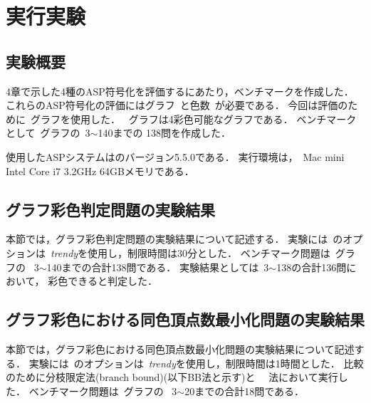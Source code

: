 \chapter{実行実験}

\section{実験概要}

4章で示した4種のASP符号化を評価するにあたり，ベンチマークを作成した．
これらのASP符号化の評価にはグラフ~と色数~が必要である．
今回は評価のために~グラフを使用した．
~グラフは4彩色可能なグラフである．
ベンチマークとして~グラフの~3$\sim$140までの
138問を作成した．

使用したASPシステムは{\clingo}のバージョン5.5.0である．
実行環境は，~Mac mini Intel Core i7 3.2GHz 64GBメモリである．

\section{グラフ彩色判定問題の実験結果}

本節では，グラフ彩色判定問題の実験結果について記述する．
実験には~{\clingo}のオプションは~\textit{trendy}を使用し，制限時間は30分とした．
ベンチマーク問題は~グラフの
~3$\sim$140までの合計138問である．
実験結果としては~3$\sim$138の合計136問において，
彩色できると判定した．

\section{グラフ彩色における同色頂点数最小化問題の実験結果}


本節では，グラフ彩色における同色頂点数最小化問題の実験結果について記述する．
実験には~{\clingo}のオプションは~\textit{trendy}を使用し，制限時間は1時間とした．
比較のために分枝限定法(branch bound)(以下BB法と示す)と
~~法において実行した．
ベンチマーク問題は~グラフの
~3$\sim$20までの合計18問である．

